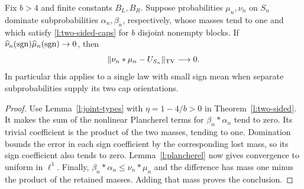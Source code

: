 \begin{corollary}
\label{l:two-sided-completion}
Fix $b>4$ and finite constants $B_L,B_R$.  Suppose probabilities
$\mu_n,\nu_n$ on $S_n$ dominate subprobabilities
$\alpha_n,\beta_n$, respectively, whose masses tend to one and
which satisfy \eqref{l:two-sided-caps} for $b$ disjoint nonempty
blocks.  If
$\widehat\nu_n(\operatorname{sgn})\widehat\mu_n(\operatorname{sgn})\to0$, then
\[
 \|\nu_n*\mu_n-U_{S_n}\|_{\mathrm{TV}}\longrightarrow0.
\]
In particular this applies to a single law with small sign mean
when separate subprobabilities supply its two cap orientations.
\end{corollary}
\begin{proof}
Use Lemma~\ref{l:joint-types} with $\eta=1-4/b>0$ in
Theorem~\ref{l:two-sided}.  It makes the sum of the nonlinear
Plancherel terms for $\beta_n*\alpha_n$ tend to zero.
Its trivial coefficient is the product of the two masses, tending
to one.  Domination bounds the error in each sign coefficient by
the corresponding lost mass, so its sign coefficient also tends
to zero.  Lemma~\ref{l:plancherel} now gives convergence to uniform
in $\ell^1$.  Finally,
$\beta_n*\alpha_n\le\nu_n*\mu_n$ and the difference has mass
one minus the product of the retained masses.  Adding that mass
proves the conclusion.
\end{proof}
